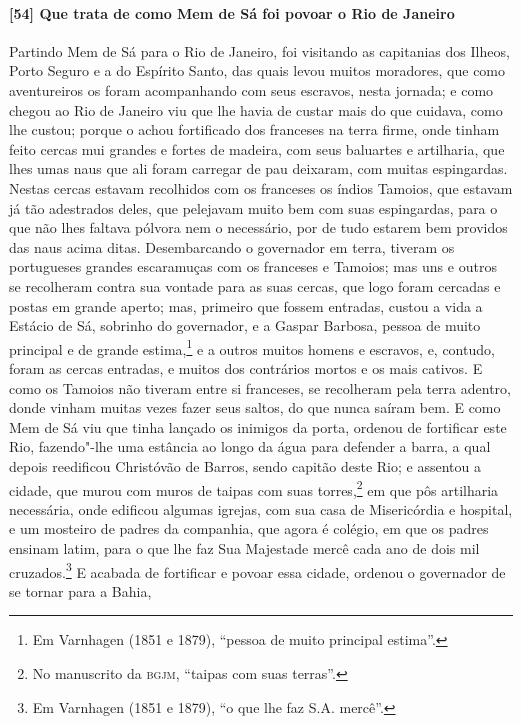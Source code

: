 \begin{linenumbers}
\paragraph{[54] Que trata de como Mem de Sá foi povoar o Rio de Janeiro} \quad
Partindo Mem de Sá para o Rio de Janeiro, foi visitando as capitanias dos Ilheos, Porto
Seguro e a do Espírito Santo, das quais levou muitos moradores, que como aventureiros os
foram acompanhando com seus escravos, nesta jornada; e como chegou ao Rio de Janeiro viu
que lhe havia de custar mais do que cuidava, como lhe custou; porque o achou fortificado
dos franceses na terra firme, onde tinham feito cercas mui grandes e fortes de madeira,
com seus baluartes e artilharia, que lhes umas naus que ali foram carregar de pau
deixaram, com muitas espingardas. Nestas cercas estavam recolhidos com os franceses os
índios Tamoios, que estavam já tão adestrados deles, que pelejavam muito bem com suas
espingardas, para o que não lhes faltava pólvora nem o necessário, por de tudo estarem bem
providos das naus acima ditas. Desembarcando o governador em terra, tiveram os portugueses
grandes escaramuças com os franceses e Tamoios; mas uns e outros se recolheram contra sua
vontade para as suas cercas, que logo foram cercadas e postas em grande aperto; mas,
primeiro que fossem entradas, custou a vida a Estácio de Sá, sobrinho do governador, e a
Gaspar Barbosa, pessoa de muito principal e de grande estima,\footnote{ Em Varnhagen (1851
e 1879), ``pessoa de muito principal estima''.} e a outros muitos homens e escravos, e,
contudo, foram as cercas entradas, e muitos dos contrários mortos e os mais cativos. E
como os Tamoios não tiveram entre si franceses, se recolheram pela terra adentro, donde
vinham muitas vezes fazer seus saltos, do que nunca saíram bem. E como Mem de Sá viu que
tinha lançado os inimigos da porta, ordenou de fortificar este Rio, fazendo"-lhe uma
estância ao longo da água para defender a barra, a qual depois reedificou Christóvão de
Barros, sendo capitão deste Rio; e assentou a cidade, que murou com muros de taipas com
suas torres,\footnote{ No manuscrito da \textsc{bgjm}, ``taipas com suas terras''.} em que
pôs artilharia necessária, onde edificou algumas igrejas, com sua casa de Misericórdia e
hospital, e um mosteiro de padres da companhia, que agora é colégio, em que os padres
ensinam latim, para o que lhe faz Sua Majestade mercê cada ano de dois mil
cruzados.\footnote{ Em Varnhagen (1851 e 1879), ``o que lhe faz S.A. mercê''.} E acabada
de fortificar e povoar essa cidade, ordenou o governador de se tornar para a Bahia,

\end{linenumbers}

